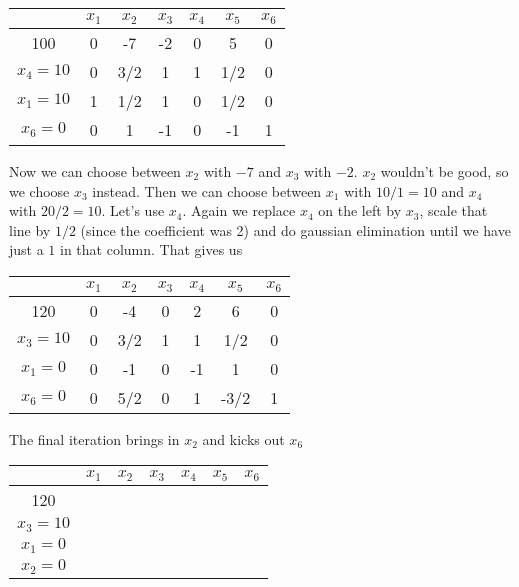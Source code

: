 \begin{Ex}
\begin{center}
\begin{tabular}{c|cccccc}
  & $x_1$ & $x_2$ & $x_3$ & $x_4$ & $x_5$ & $x_6$ \\\hline
100 & 0 & -7 & -2 & 0 & 5 & 0\\
$x_4=10$ & 0 & 3/2 & 1 & 1 & 1/2 & 0 \\
$x_1=10$ & 1 & 1/2 & 1 & 0 &  1/2 & 0\\
$x_6=0$ & 0 & 1 & -1 & 0 & -1 &  1\\
\end{tabular}
\end{center}

Now we can choose between $x_2$ with $-7$ and $x_3$ with $-2$. $x_2$ wouldn't be good, %
so we choose $x_3$ instead. Then we can choose between $x_1$ with $10/1=10$ and $x_4$ with $20/2=10$. Let's use $x_4$. Again we replace $x_4$ on the left by $x_3$, scale that line by $1/2$ (since the coefficient was 2) and do gaussian elimination until we have just a $1$ in that column. That gives us


\begin{center}
\begin{tabular}{c|cccccc}
  & $x_1$ & $x_2$ & $x_3$ & $x_4$ & $x_5$ & $x_6$ \\\hline
120 & 0 & -4 & 0 & 2 & 6 & 0\\
$x_3=10$ & 0 & 3/2 & 1 & 1 & 1/2 & 0 \\
$x_1=0$ &0  & -1 & 0 & -1 &  1 & 0\\
$x_6=0$ & 0 & 5/2 & 0 & 1 & -3/2 &  1\\
\end{tabular}
\end{center}

The final iteration brings in $x_2$ and kicks out $x_6$

\begin{center}
\begin{tabular}{c|cccccc}
         & $x_1$ & $x_2$ & $x_3$ & $x_4$ & $x_5$ & $x_6$ \\\hline
120      &\\
$x_3=10$ &\\
$x_1=0$  &\\
$x_2=0$  &\\
\end{tabular}
\end{center}
\end{Ex}



